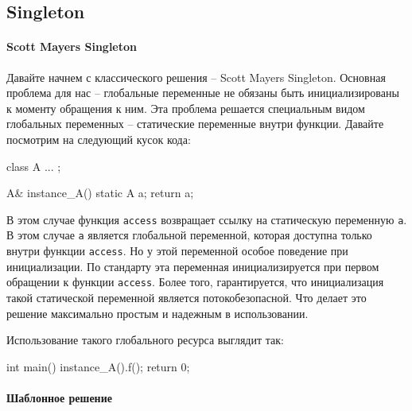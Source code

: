\subsection{Singleton}
\label{section::Singleton}

\paragraph{Scott Mayers Singleton}

Давайте начнем с классического решения -- Scott Mayers Singleton.
Основная проблема для нас -- глобальные переменные не обязаны быть инициализированы к моменту обращения к ним.
Эта проблема решается специальным видом глобальных переменных -- статические переменные внутри функции.
Давайте посмотрим на следующий кусок кода:
\begin{cppcode}
class A { ... };

A& instance_A() {
  static A a;
  return a;
}
\end{cppcode}
В этом случае функция \verb"access" возвращает ссылку на статическую переменную \verb"a".
В этом случае \verb"a" является глобальной переменной, которая доступна только внутри функции \verb"access".
Но у этой переменной особое поведение при инициализации.
По стандарту эта переменная инициализируется при первом обращении к функции \verb"access".
Более того, гарантируется, что инициализация такой статической переменной является потокобезопасной.
Что делает это решение максимально простым и надежным в использовании.

Использование такого глобального ресурса выглядит так:
\begin{cppcode}
int main() {
  instance_A().f();
  return 0;
}
\end{cppcode}

\paragraph{Шаблонное решение}

